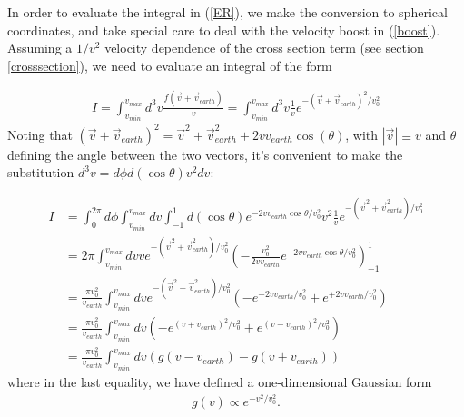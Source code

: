 \documentclass[11pt]{amsart}
\begin{document}
In order to evaluate the integral in (\ref{ER}), we make the conversion to spherical coordinates, and take special care to deal with the velocity boost in (\ref{boost}). Assuming a $1/v^2$ velocity dependence of the cross section term (see section \ref{crosssection}), we need to evaluate an integral of the form

\begin{equation}
\begin{split}
	I = \int_{v_{min}}^{v_{max}} d^3v \frac{f(\vec{v} + \vec{v}_{earth})}{v} =
    	\int_{v_{min}}^{v_{max}} d^3v \frac{1}{v} e^{-(\vec{v}+\vec{v}_{earth})^2/v_0^2}
\end{split}
\end{equation}
Noting that $(\vec{v}+\vec{v}_{earth})^2 = \vec{v}^2 + \vec{v}^2_{earth} + 2vv_{earth}\cos(\theta)$, with $|\vec{v}|\equiv v$ and $\theta$ defining the angle between the two vectors, it's convenient to make the substitution $d^3v = d\phi d(\cos \theta) v^2 dv$:

\begin{equation}
\begin{split}
	I &=  \int_0^{2\pi} d\phi \int_{v_{min}}^{v_{max}} dv \int_{-1}^1 d(\cos \theta) e^{-2vv_{earth}\cos\theta/v_0^2} v^2 \frac{1}{v} e^{-(\vec{v}^2+\vec{v}^2_{earth})/v_0^2}\\
	&= 2\pi \int_{v_{min}}^{v_{max}} dv v e^{-(\vec{v}^2+\vec{v}^2_{earth})/v_0^2} \left(-\frac{v_0^2}{2vv_{earth}} e^{-2vv_{earth}\cos\theta/v_0^2}\right)_{-1}^1\\
	&= \frac{\pi v_0^2}{v_{earth} }\int_{v_{min}}^{v_{max}} dv e^{-(\vec{v}^2+\vec{v}^2_{earth})/v_0^2} 
		\left(- e^{-2vv_{earth}/v_0^2} + e^{+2vv_{earth}/v_0^2}\right)\\
	&= \frac{\pi v_0^2}{v_{earth} }\int_{v_{min}}^{v_{max}} dv 
		\left(- e^{(v+v_{earth})^2/v_0^2} + e^{(v-v_{earth})^2/v_0^2}\right)\\
	&= \frac{\pi v_0^2}{v_{earth} }\int_{v_{min}}^{v_{max}} dv 
		\left( g(v-v_{earth}) - g(v+v_{earth}) \right)
\end{split}
\end{equation}
where in the last equality, we have defined a one-dimensional Gaussian form
\begin{equation}
\begin{split}
	g(v) \propto e^{-v^2/v_0^2}.
\end{split}
\end{equation}
\end{document}
